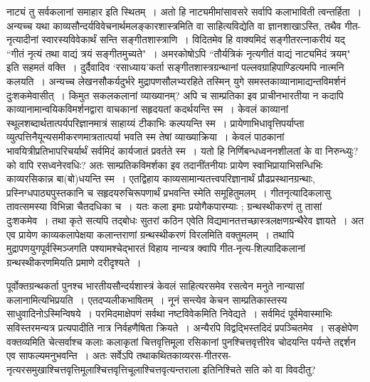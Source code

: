 {\dev नाट्यं तु सर्वकलानां समाहार इति स्थितम्~। अतो हि नाट्यमीमांसावसरे सर्वापि कलाभाविती त्वन्तर्हिता~। अन्यच्च यथा काव्यसौन्दर्यविवेचनार्थमलङ्कारशास्त्रमिति वा साहित्यविद्येति वा ज्ञानशाखाऽस्ति, तथैव गीत-नृत्यादीनां स्वारस्यविवेकार्थं सन्ति सङ्गीतशास्त्राणि~। विदितमेव हि वाक्यमिदं सङ्गीतरत्नाकरीयं यद् ``गीतं नृत्यं तथा वाद्यं त्रयं सङ्गीतमुच्यते"~। अमरकोषोऽपि ``तौर्यत्रिकं नृत्यगीतं वाद्यं नाट्यमिदं त्रयम्" इति सहमतं वक्ति~। दुर्दैवादिव ‘रसाध्याय’कर्ता सङ्गीतशास्त्रग्रन्थानां पल्लवग्राहिपाण्डित्यमपि नात्मनि कलयति~। अन्यच्च लेखनसौकर्यदुर्भरे मुद्रापणसौलभ्यरहिते तस्मिन् युगे समस्तकाव्यानामाद्यन्तविमर्शनं दुःशकमेवासीत्~। किमुत सकलकलानां व्याख्यानम्? अपि च साम्प्रतिका इव प्राचीनभारतीया न कदापि काव्यानामा\-न्वयिकविमर्शनद्वारा वाचकानां सहृदयतां कदर्थयन्ति स्म~। केवलं काव्यानां स्थूलशब्दार्थता\-त्पर्यपरिज्ञानमात्रं साहाय्यं टीकाभिः कल्पयन्ति स्म~। प्रायेणाभिधावृत्तिपर्याप्ता व्युत्पत्तिनैयून्य\-समीकरणमात्रतात्पर्या भवति स्म तेषां व्याख्याक्रिया~। केवलं पाठकानां भावयित्रीप्रतिभापरि\-चर्यार्थं सर्वमिदं कार्यजातं प्रवर्तते स्म~। यतो हि निर्णिबन्धध्वननशीलतां के वा निरुन्ध्युः? को वापि रसध्वनेरवधिः? अतः साम्प्रतिकविमर्शका इव तदानींतनीयाः प्रायेण स्वाभिप्रायाभि\-सन्धिभिः काव्यरसिकान्न बा(बो)धयन्ति स्म~। एतद्विहाय काव्यसामान्यतत्त्वपरिज्ञानार्थं प्रौढप्रस्थानग्रन्थाः, प्रस्निग्धपाठ्यपुस्तकानि च सहृदयरुचिरूपणार्थं प्रभवन्ति स्मेति समूहितुमलम्~। गीतनृत्यादिकलासु तावत्समस्या विभिन्ना चैतदधिका च~। यतः कला इमाः प्रयोगैकपारम्याः ; ग्रन्थस्थीकरणं तु तासां दुःशकमेव~। तथा कृते सत्यपि तद्बोधः सुतरां कठिन एवेति विद्यमानतत्तच्छास्त्रलक्षणग्रन्थैरेव ज्ञायते~। अत एव प्रायेण काव्यकलापेक्षया कलान्तराणां ग्रन्थस्थीकरणं विरलमिति वक्तुमलम्~। तथापि मुद्रापणयुगपूर्वस्मिञ्जगति पश्यामश्चेद्भारतं विहाय नान्यत्र क्वापि गीत-नृत्य-शिल्पादिकलानां ग्रन्थस्थीकरणमियति प्रमाणे दरीदृश्यते~।}

{\dev पूर्वोक्तग्रन्थकर्ता पुनश्च भारतीयसौन्दर्यशास्त्रं केवलं साहित्यरसमेव रसत्वेन मनुते}  {\dev नान्यासां कलानामित्यभिप्रयति~। एतदप्यलीकभाषितम्~। नूनं सन्त्येव केचन साम्प्रतिकास्तस्य साधु\-वादिनोऽस्मिन्विषये~। परमिदमाक्षेपणं सर्वथा नष्टविवेकमिति निवेद्यते~। सर्वमिदं पूर्वमेवा\-स्माभिः सविस्तरमन्यत्र प्रत्यपादीति नात्र निर्वहणैषिता क्रियते~।} {\dev अन्यैरपि विद्वद्भिस्तदिदं प्रपञ्चितमेव~। सङ्क्षेपेण वक्तव्यमिति चेत्सर्वाश्च कलाः कला\-कृतां चित्तवृत्तिमूला रसिकानां पुनश्चित्तवृत्तीरेव चोदयन्ति पर्यन्ते तद्दर्शन एव साफल्यमनु\-भवन्ति~। अतः सर्वेऽपि तथा\-कथित\-काव्यरस-गीतरस-नृत्यरसमुखाश्चित्तवृत्तिमूलाश्चित्तवृत्ति\-चूलाश्चित्तवृत्यन्तराला इति\break निश्चिते सति को वा विवदीतु?}


